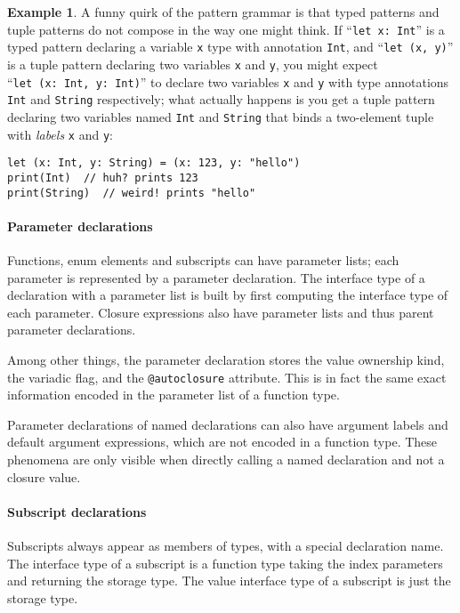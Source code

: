 \documentclass[a4paper,headsepline,bibliography=totoc,toc=flat,fleqn,twoside=semi]{scrbook}
\theoremstyle{definition}
\theoremstyle{definition}
\newtheorem{example}{Example}[chapter]
\theoremstyle{definition}
\begin{document}
\begin{example}
A funny quirk of the pattern grammar is that typed patterns and tuple patterns do not compose in the way one might think. If ``\texttt{let x:~Int}'' is a typed pattern declaring a variable \texttt{x} type with annotation \texttt{Int}, and ``\texttt{let (x, y)}'' is a tuple pattern declaring two variables \texttt{x} and \texttt{y}, you might expect ``\texttt{let~(x:~Int,~y:~Int)}'' to declare two variables \texttt{x} and \texttt{y} with type annotations \texttt{Int} and \texttt{String} respectively; what actually happens is you get a tuple pattern declaring two variables named \texttt{Int} and \texttt{String} that binds a two-element tuple with \emph{labels} \texttt{x} and \texttt{y}:
\begin{Verbatim}
let (x: Int, y: String) = (x: 123, y: "hello")
print(Int)  // huh? prints 123
print(String)  // weird! prints "hello"
\end{Verbatim}
\end{example}

\paragraph{Parameter declarations} Functions, enum elements and subscripts can have parameter lists; each parameter is represented by a parameter declaration. The interface type of a declaration with a parameter list is built by first computing the interface type of each parameter. Closure expressions also have parameter lists and thus parent parameter declarations.

Among other things, the parameter declaration stores the value ownership kind, the variadic flag, and the \texttt{@autoclosure} attribute. This is in fact the same exact information encoded in the parameter list of a function type.

Parameter declarations of named declarations can also have argument labels and default argument expressions, which are not encoded in a function type. These phenomena are only visible when directly calling a named declaration and not a closure value.

\paragraph{Subscript declarations} Subscripts always appear as members of types, with a special declaration name. The interface type of a subscript is a function type taking the index parameters and returning the storage type. The value interface type of a subscript is just the storage type.
\end{document}

